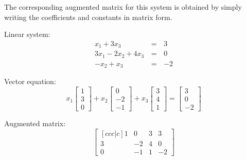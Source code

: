 \begin{example}
  The corresponding augmented matrix for this system is obtained by
  simply writing the coefficients and constants in matrix form.

  \begin{multicols}{3}
    Linear system:
    \begin{alignat*}{2}
       x_1 + 3x_3 &\,=\,& 3 \\
      3x_1 - 2x_2 + 4x_3 &\,=\,& 0 \\
      -x_2 +  x_3 &\,=\,& -2
    \end{alignat*}

    \columnbreak
    Vector equation:
\[ x_1 \begin{bmatrix} 1 \\ 3 \\ 0 \end{bmatrix}+ x_2 \begin{bmatrix} 0 \\ -2 \\ -1 \end{bmatrix} + x_3 \begin{bmatrix} 3 \\ 4 \\1 \end{bmatrix} = \begin{bmatrix} 3 \\ 0 \\ -2 \end{bmatrix}\]

    \columnbreak

    Augmented matrix:
    \[
      \begin{bmatrix}[ccc|c]
        1 & 0 & 3 & 3 \\
        3 & -2 & 4 & 0 \\
        0 & -1 & 1 & -2
      \end{bmatrix}
    \]
  \end{multicols}
\end{example}

